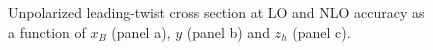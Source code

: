 \begin{figure}
    \centering
    \caption{Unpolarized leading-twist cross section at LO and NLO accuracy as a function of $x_B$ (panel a), $y$ (panel b) and $z_h$ (panel c).}
    \label{fig:plotNLOUUU}
\end{figure} 


\clearpage

